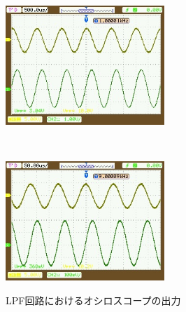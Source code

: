 \documentclass[a4paper,11pt]{jsarticle}
\begin{document}
\begin{figure}[H]
\begin{center}
\begin{minipage}{0.48\textwidth}
      \label{P:LPF_500}
    \end{minipage}
    \begin{minipage}{0.48\textwidth}
      \begin{center}
        \includegraphics[clip,width=6cm]{picture/LPF/1000.jpeg}
      \end{center}
      \label{P:LPF_1000}
    \end{minipage} \\
    \begin{minipage}{0.48\textwidth}
      \begin{center}
        \includegraphics[clip,width=6cm]{picture/LPF/9000.jpeg}
      \end{center}
      \label{P:LPF_9000}
    \end{minipage}
    \caption{LPF回路におけるオシロスコープの出力}
    \label{P:Scope_LPF}
  \end{center}
\end{figure}
\end{document}
